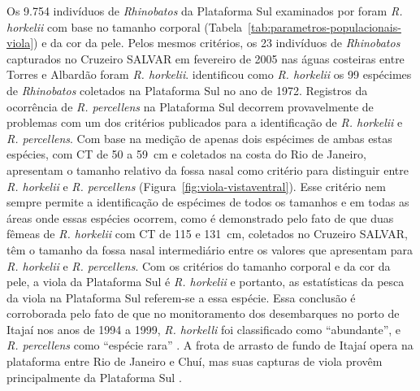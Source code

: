 \documentclass[a4paper,11pt,twoside,showtrims,onecolumn,openright,final]{memoir}
\begin{document}
Os 9.754 indivíduos de \emph{Rhinobatos} da Plataforma Sul examinados por \citet{lessa1982} %
foram \emph{R. horkelii} com base no tamanho corporal (Tabela~\ref{tab:parametros-populacionais-viola})
e da cor da pele. Pelos mesmos critérios, os 23 indivíduos de \emph{Rhinobatos} 
capturados no Cruzeiro SALVAR em fevereiro de 2005 nas águas costeiras 
entre Torres e Albardão foram \emph{R. horkelii}. \citet{sadowsky1973} %
identificou  como \emph{R. horkelii} os 99 espécimes de \emph{Rhinobatos} coletados na Plataforma Sul 
no ano de 1972. Registros da ocorrência de \emph{R. percellens} na Plataforma Sul \citep{chao1982} %
decorrem provavelmente de problemas com um dos critérios 
publicados para a identificação de \emph{R. horkelii} e \emph{R. percellens}. Com base na 
medição de apenas dois espécimes de ambas estas espécies, com CT de 50 a 59~cm e 
coletados na costa do Rio de Janeiro,  \citet{bigelow1953} %
apresentam o tamanho relativo da fossa nasal como critério para distinguir entre \emph{R. horkelii} 
e \emph{R. percellens} (Figura~\ref{fig:viola-vistaventral}). %
Esse critério nem sempre permite a identificação de espécimes de 
todos os tamanhos e em todas as áreas onde essas espécies ocorrem, como é demonstrado 
pelo fato de que duas fêmeas de \emph{R. horkelii} com CT de 115 e 131~cm, coletados no 
Cruzeiro SALVAR, têm o tamanho da fossa nasal intermediário entre os valores  
que \citet{bigelow1953} %
apresentam para \emph{R. horkelii} e \emph{R. percellens}. 
Com os critérios do tamanho corporal e da cor da pele, a viola da Plataforma Sul 
é \emph{R. horkelii} e portanto, as estatísticas da pesca da viola na Plataforma Sul 
referem-se a essa espécie. Essa conclusão é corroborada pelo fato de que no 
monitoramento dos desembarques no porto de Itajaí nos anos de 1994 a 1999,  
\emph{R. horkelli} foi classificado como ``abundante'', e \emph{R. percellens} 
como ``espécie rara'' \citep{mazzoleni1999}. %
A frota de arrasto de fundo de Itajaí opera na plataforma entre Rio de Janeiro e Chuí, 
mas suas capturas de viola provêm principalmente da Plataforma Sul \citep{martins2003}. %

%
%
\end{document}
